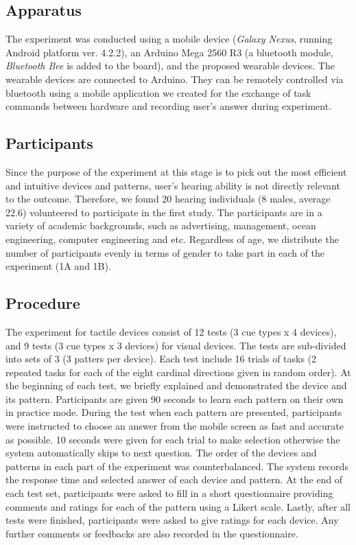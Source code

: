 \documentclass{sigchi}
\begin{document}
\subsection{Apparatus}
The experiment was conducted using a mobile device (\textit{Galaxy Nexus}, running Android platform ver. 4.2.2), an Arduino Mega 2560 R3 (a bluetooth module, \textit{Bluetooth Bee} is added to the board), and the proposed wearable devices. The wearable devices are connected to Arduino. They can be remotely controlled via bluetooth using a mobile application we created for the exchange of task commands between hardware and recording user's answer during experiment.

\subsection{Participants}
Since the purpose of the experiment at this stage is to pick out the most efficient and intuitive devices and patterns, user’s hearing ability is not directly relevant to the outcome. Therefore, we found 20 hearing individuals (8 males, average 22.6) volunteered to participate in the first study. The participants are in a variety of academic backgrounds, such as advertising, management, ocean engineering, computer engineering and etc. Regardless of age, we distribute the number of participants evenly in terms of gender to take part in each of the experiment (1A and 1B).

\subsection{Procedure}


The experiment for tactile devices consist of 12 tests (3 cue types x 4 devices), and 9 tests (3 cue types x 3 devices) for visual devices. The tests are sub-divided into sets of 3 (3 patters per device). Each test include 16 trials of tasks (2 repeated tasks for each of the eight cardinal directions given in random order). At the beginning of each test, we briefly explained and demonstrated the device and its pattern. Participants are given 90 seconds to learn each pattern on their own in practice mode. During the test when each pattern are presented, participants were instructed to choose an answer from the mobile screen as fast and accurate as possible. 10 seconds were given for each trial to make selection otherwise the system automatically skips to next question. The order of the devices and patterns in each part of the experiment was counterbalanced. The system records the response time and selected answer of each device and pattern. At the end of each test set, participants were asked to fill in a short questionnaire providing comments and ratings for each of the pattern using a Likert scale. Lastly, after all tests were finished, participants were asked to give ratings for each device. Any further comments or feedbacks are also recorded in the questionnaire.
\end{document}

